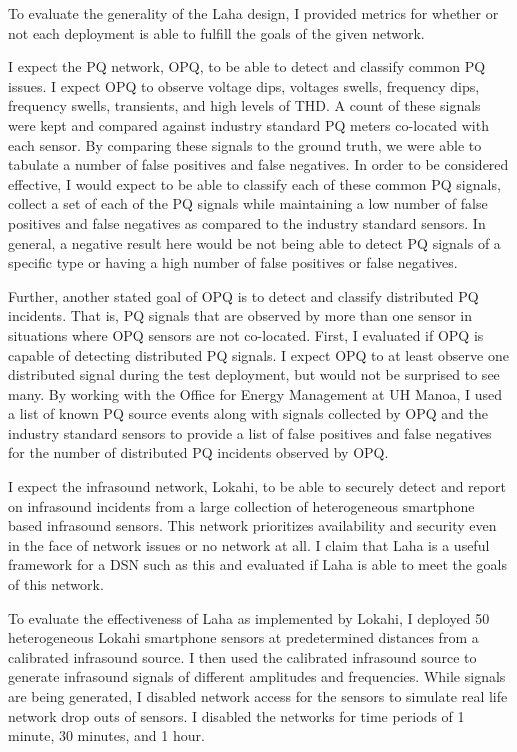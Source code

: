 To evaluate the generality of the Laha design, I provided metrics for whether or not each deployment is able to fulfill the goals of the given network.

I expect the PQ network, OPQ, to be able to detect and classify common PQ issues. I expect OPQ to observe voltage dips, voltages swells, frequency dips, frequency swells, transients, and high levels of THD. A count of these signals were kept and compared against industry standard PQ meters co-located with each sensor. By comparing these signals to the ground truth, we were able to tabulate a number of false positives and false negatives. In order to be considered effective, I would expect to be able to classify each of these common PQ signals, collect a set of each of the PQ signals while maintaining a low number of false positives and false negatives as compared to the industry standard sensors. In general, a negative result here would be not being able to detect PQ signals of a specific type or having a high number of false positives or false negatives.

Further, another stated goal of OPQ is to detect and classify distributed PQ incidents. That is, PQ signals that are observed by more than one sensor in situations where OPQ sensors are not co-located. First, I evaluated if OPQ is capable of detecting distributed PQ signals. I expect OPQ to at least observe one distributed signal during the test deployment, but would not be surprised to see many. By working with the Office for Energy Management at UH Manoa, I used a list of known PQ source events along with signals collected by OPQ and the industry standard sensors to provide a list of false positives and false negatives for the number of distributed PQ incidents observed by OPQ\@.

I expect the infrasound network, Lokahi, to be able to securely detect and report on infrasound incidents from a large collection of heterogeneous smartphone based infrasound sensors. This network prioritizes availability and security even in the face of network issues or no network at all. I claim that Laha is a useful framework for a DSN such as this and evaluated if Laha is able to meet the goals of this network.

To evaluate the effectiveness of Laha as implemented by Lokahi, I deployed 50 heterogeneous Lokahi smartphone sensors at predetermined distances from a calibrated infrasound source. I then used the calibrated infrasound source to generate infrasound signals of different amplitudes and frequencies. While signals are being generated, I disabled network access for the sensors to simulate real life network drop outs of sensors. I disabled the networks for time periods of 1 minute, 30 minutes, and 1 hour.

